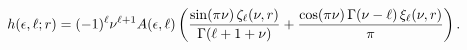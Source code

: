 \[\mathop{h\/}\nolimits\!\left(\epsilon,\ell;r\right)=(-1)^{\ell}\nu^{\ell+1}A(%
\epsilon,\ell)\left(\frac{\mathop{\sin\/}\nolimits\!\left(\pi\nu\right)\zeta_{%
\ell}(\nu,r)}{\mathop{\Gamma\/}\nolimits\!\left(\ell+1+\nu\right)}+\frac{%
\mathop{\cos\/}\nolimits\!\left(\pi\nu\right)\mathop{\Gamma\/}\nolimits\!\left%
(\nu-\ell\right)\xi_{\ell}(\nu,r)}{\pi}\right).\]